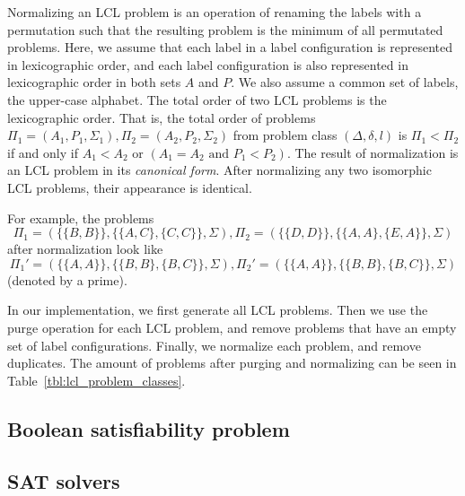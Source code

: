 Normalizing an LCL problem is an operation of renaming the labels with a permutation such that the resulting problem is the minimum of all permutated problems.
Here, we assume that each label in a label configuration is represented in lexicographic order, and each label configuration is also represented in lexicographic order in both sets $A$ and $P$.
We also assume a common set of labels, the upper-case alphabet.
The total order of two LCL problems is the lexicographic order.
That is, the total order of problems $\Pi_1=(A_1, P_1, \Sigma_1), \Pi_2=(A_2, P_2, \Sigma_2)$ from problem class $(\Delta, \delta, l)$ is $\Pi_1 < \Pi_2$ if and only if $A_1 < A_2$ or $(A_1 = A_2 \text{ and } P_1 < P_2)$.
The result of normalization is an LCL problem in its \emph{canonical form}.
After normalizing any two isomorphic LCL problems, their appearance is identical.

For example, the problems $$\Pi_1=(\{\{B, B\}\}, \{\{A, C\}, \{C,C\}\}, \Sigma), \Pi_2=(\{\{D, D\}\}, \{\{A,A\},\{E, A\}\}, \Sigma)$$ after normalization look like $$\Pi_1'=(\{\{A, A\}\}, \{\{B,B\},\{B, C\}\}, \Sigma), \Pi_2'=(\{\{A, A\}\}, \{\{B,B\},\{B, C\}\}, \Sigma)$$ (denoted by a prime).

In our implementation, we first generate all LCL problems.
Then we use the purge operation for each LCL problem, and remove problems that have an empty set of label configurations.
Finally, we normalize each problem, and remove duplicates.
The amount of problems after purging and normalizing can be seen in Table~\ref{tbl:lcl_problem_classes}.


\subsection{Boolean satisfiability problem}

\subsection{SAT solvers} %

